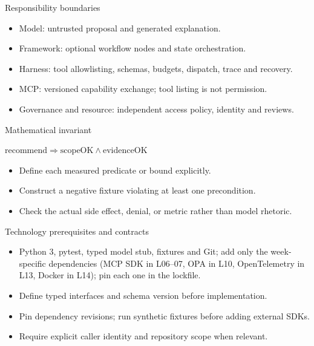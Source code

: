 \documentclass[aspectratio=169,10pt]{beamer}
\begin{document}
\begin{frame}{Responsibility boundaries}
\small
\begin{itemize}
\item Model: untrusted proposal and generated explanation.
\item Framework: optional workflow nodes and state orchestration.
\item Harness: tool allowlisting, schemas, budgets, dispatch, trace and recovery.
\item MCP: versioned capability exchange; tool listing is not permission.
\item Governance and resource: independent access policy, identity and reviews.
\end{itemize}

\end{frame}

\begin{frame}{Mathematical invariant}
\small
\begin{center}\Large $\mathrm{recommend}\Rightarrow\mathrm{scopeOK}\land\mathrm{evidenceOK}$\end{center}
\begin{itemize}
\item Define each measured predicate or bound explicitly.
\item Construct a negative fixture violating at least one precondition.
\item Check the actual side effect, denial, or metric rather than model rhetoric.
\end{itemize}

\end{frame}

\begin{frame}{Technology prerequisites and contracts}
\small
\begin{itemize}
\item Python 3, pytest, typed model stub, fixtures and Git; add only the week-specific dependencies (MCP SDK in L06--07, OPA in L10, OpenTelemetry in L13, Docker in L14); pin each one in the lockfile.
\item Define typed interfaces and schema version before implementation.
\item Pin dependency revisions; run synthetic fixtures before adding external SDKs.
\item Require explicit caller identity and repository scope when relevant.
\end{itemize}

\end{frame}
\end{document}
